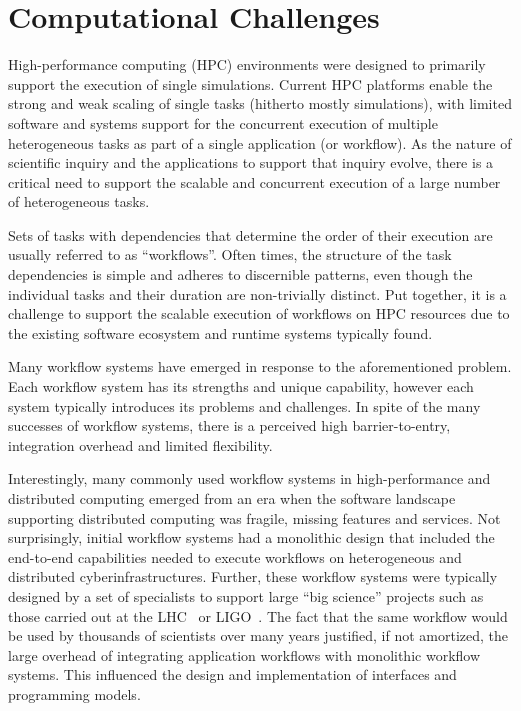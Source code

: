 \documentclass[conference]{IEEEtran}
\begin{document}
\section{Computational Challenges}\label{sec:cc}



High-performance computing (HPC) environments were designed to primarily
support the execution of single simulations. Current HPC platforms enable the
strong and weak scaling of single tasks (hitherto mostly simulations), with
limited software and systems support for the concurrent execution of multiple
heterogeneous tasks as part of a single application (or workflow). As the
nature of scientific inquiry and the applications to support that inquiry
evolve, there is a critical need to support the scalable and concurrent
execution of a large number of heterogeneous tasks.

Sets of tasks with dependencies that determine the order of their execution
are usually referred to as ``workflows''. Often times, the structure of the
task dependencies is simple and adheres to discernible patterns, even though
the individual tasks and their duration are non-trivially distinct. Put
together, it is a challenge to support the scalable execution of workflows on
HPC resources due to the existing software ecosystem and runtime systems
typically found.

Many workflow systems have emerged in response to the aforementioned problem.
Each workflow system has its strengths and unique capability, however each
system typically introduces its problems and challenges. In spite of the many
successes of workflow systems, there is a perceived high barrier-to-entry,
integration overhead and limited flexibility.

Interestingly, many commonly used workflow systems in high-performance and
distributed computing emerged from an era when the software landscape
supporting distributed computing was fragile, missing features and services.
Not surprisingly, initial workflow systems had a monolithic design that
included the end-to-end capabilities needed to execute workflows on
heterogeneous and distributed cyberinfrastructures. Further, these workflow
systems were typically designed by a set of specialists to support large
``big science'' projects such as those carried out at the
LHC~\cite{breskin2009cern} or LIGO~\cite{althouse1992ligo}. The fact that the
same workflow would be used by thousands of scientists over many years
justified, if not amortized, the large overhead of integrating application
workflows with monolithic workflow systems. This influenced the design and
implementation of interfaces and programming models.
\end{document}
